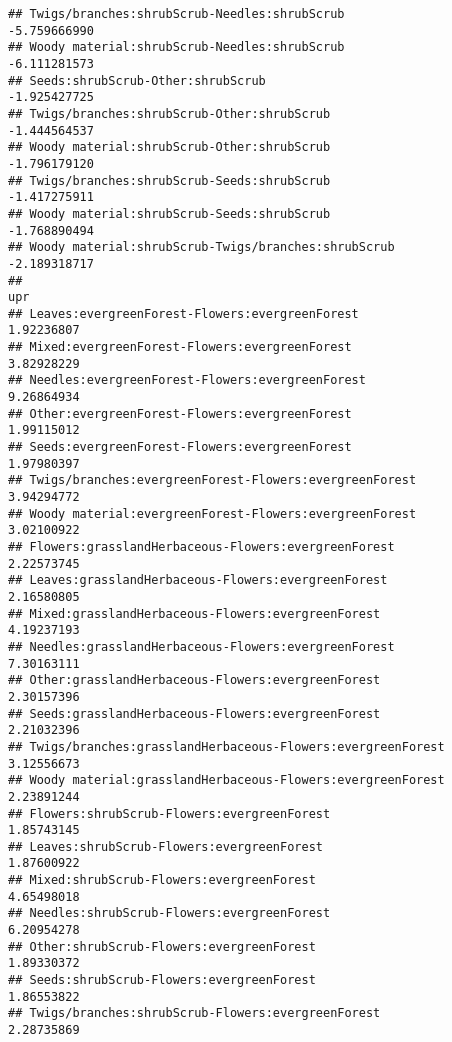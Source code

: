 \documentclass[
]{article}
\begin{document}
\begin{verbatim}
## Twigs/branches:shrubScrub-Needles:shrubScrub                          -5.759666990
## Woody material:shrubScrub-Needles:shrubScrub                          -6.111281573
## Seeds:shrubScrub-Other:shrubScrub                                     -1.925427725
## Twigs/branches:shrubScrub-Other:shrubScrub                            -1.444564537
## Woody material:shrubScrub-Other:shrubScrub                            -1.796179120
## Twigs/branches:shrubScrub-Seeds:shrubScrub                            -1.417275911
## Woody material:shrubScrub-Seeds:shrubScrub                            -1.768890494
## Woody material:shrubScrub-Twigs/branches:shrubScrub                   -2.189318717
##                                                                               upr
## Leaves:evergreenForest-Flowers:evergreenForest                         1.92236807
## Mixed:evergreenForest-Flowers:evergreenForest                          3.82928229
## Needles:evergreenForest-Flowers:evergreenForest                        9.26864934
## Other:evergreenForest-Flowers:evergreenForest                          1.99115012
## Seeds:evergreenForest-Flowers:evergreenForest                          1.97980397
## Twigs/branches:evergreenForest-Flowers:evergreenForest                 3.94294772
## Woody material:evergreenForest-Flowers:evergreenForest                 3.02100922
## Flowers:grasslandHerbaceous-Flowers:evergreenForest                    2.22573745
## Leaves:grasslandHerbaceous-Flowers:evergreenForest                     2.16580805
## Mixed:grasslandHerbaceous-Flowers:evergreenForest                      4.19237193
## Needles:grasslandHerbaceous-Flowers:evergreenForest                    7.30163111
## Other:grasslandHerbaceous-Flowers:evergreenForest                      2.30157396
## Seeds:grasslandHerbaceous-Flowers:evergreenForest                      2.21032396
## Twigs/branches:grasslandHerbaceous-Flowers:evergreenForest             3.12556673
## Woody material:grasslandHerbaceous-Flowers:evergreenForest             2.23891244
## Flowers:shrubScrub-Flowers:evergreenForest                             1.85743145
## Leaves:shrubScrub-Flowers:evergreenForest                              1.87600922
## Mixed:shrubScrub-Flowers:evergreenForest                               4.65498018
## Needles:shrubScrub-Flowers:evergreenForest                             6.20954278
## Other:shrubScrub-Flowers:evergreenForest                               1.89330372
## Seeds:shrubScrub-Flowers:evergreenForest                               1.86553822
## Twigs/branches:shrubScrub-Flowers:evergreenForest                      2.28735869

\end{verbatim}
\end{document}
